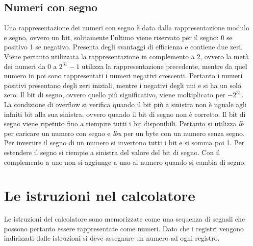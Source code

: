 \subsection{Numeri con segno}
Una rappresentazione dei numeri con segno \`e data dalla rappresentazione modulo e segno, ovvero un bit, solitamente l'ultimo viene riservato per il segno: 0 se positivo 1 se 
negativo. Presenta degli svantaggi di efficienza e contiene due zeri. Viene pertanto utilizzata la rappresentazione in complemento a 2, ovvero la met\`a dei numeri da $0$ a $2^{31}-1$ utilizza la rappresentazione precedente, mentre da quel numero in poi sono rappresentati i numeri negativi crescenti. Pertanto i numeri positivi presentano degli zeri
iniziali, mentre i negativi degli uni e si ha un solo zero. Il bit di segno, ovvero quello pi\`u significativo, viene moltiplicato per $-2^{31}$. La condizione di overflow si 
verifica quando il bit pi\`u a sinistra non \`e uguale agli infniti bit alla sua sinistra, ovvero quando il bit di segno non \`e corretto. Il bit di segno viene ripetuto fino
a riempire tutti i bit disponibili. Pertanto si utilizza \emph{lb} per caricare un numero con segno e \emph{lbu} per un byte con un numero senza segno. Per invertire il segno
di un numero si invertono tutti i bit e si somma poi 1. Per estendere il segno si riempie a sinistra del valore del bit di segno. Con il complemento a uno non si aggiunge a uno
al numero quando si cambia di segno. 
\section{Le istruzioni nel calcolatore}
Le istruzioni del calcolatore sono memorizzate come una sequenza di segnali che possono pertanto essere rappresentate come numeri. Dato che i registri vengono indirizzati dalle
istruzioni si deve assegnare un numero ad ogni registro. 